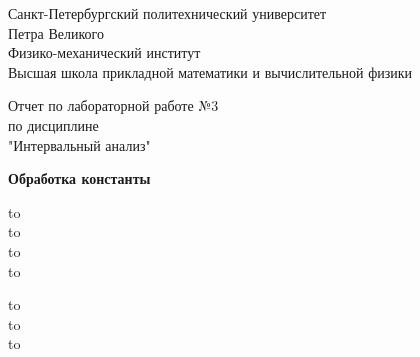 \documentclass[10pt]{article}
\begin{document}
\begin{titlepage}

\Large

\begin{center}

Санкт-Петербургский политехнический университет \\ Петра Великого \\
Физико-механический институт \\
Высшая школа прикладной математики и вычислительной
физики

\vspace{6em}

Отчет по лабораторной работе №3\\
по дисциплине\\
"Интервальный анализ"\\

\vspace{2em}

\textbf{Обработка константы}\\

\end{center}


\vspace{5em}

\newbox{\lbox}

\newlength{\maxl}
\setlength{\maxl}{\wd\lbox}

\hfill\parbox{12cm}{
\hspace*{3cm}\hspace*{-5cm}\hfill\hbox to\maxl{ \hfill}\\
\vspace{0.5em}
\hspace*{3cm}\hspace*{-5cm}\hfill\hbox to\\
\hspace*{3cm}\hspace*{-5cm}\hfill\hbox to\\
\hspace*{3cm}\hspace*{-5cm}\hfill\hbox to\\

\vspace{0.5em}

\hspace*{3cm}\hspace*{-5cm}\hfill\hbox to\\
\hspace*{3cm}\hspace*{-5cm}\hfill\hbox to\\
\hspace*{3cm}\hspace*{-5cm}\hfill\hbox to\\
}



\end{titlepage}
\end{document}
